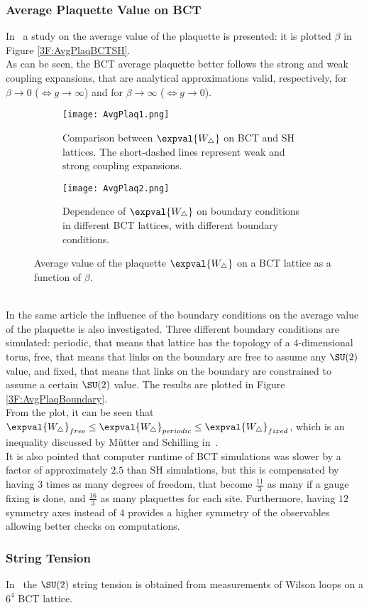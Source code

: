 \subsubsection{Average Plaquette Value on BCT}
In~\cite{Celmaster:1983vy} a study on the average value of the plaquette is presented: it is plotted \wrt $\beta$ in Figure \eqref{3F:AvgPlaqBCTSH}.\\
As can be seen, the BCT average plaquette better follows the strong and weak coupling expansions, that are analytical approximations valid, respectively, for $\beta\to0$ ($\Leftrightarrow g\to\infty$) and for $\beta\to\infty$ ($\Leftrightarrow g\to0$).
\begin{figure}[!htbp]
    \centering
    \begin{subfigure}[b]{0.475\textwidth}
        \texttt{[image: AvgPlaq1.png]}
        \caption{Comparison between $\expval{W_\bigtriangleup}$ on BCT and SH lattices. The short-dashed lines represent weak and strong coupling expansions.}
        \label{3F:AvgPlaqBCTSH}
    \end{subfigure}
    \hfill
    \begin{subfigure}[b]{0.475\textwidth}
        \texttt{[image: AvgPlaq2.png]}
        \caption{Dependence of $\expval{W_\bigtriangleup}$ on boundary conditions in different BCT lattices, with different boundary conditions.}
        \label{3F:AvgPlaqBoundary}
    \end{subfigure}
    \caption{Average value of the plaquette $\expval{W_\bigtriangleup}$ on a BCT lattice as a function of $\beta$.}
\end{figure}\\
In the same article the influence of the boundary conditions on the average value of the plaquette is also investigated.
Three different boundary conditions are simulated: periodic, that means that lattice has the topology of a $4$-dimensional torus, free, that means that links on the boundary are free to assume any $\SU(2)$ value, and fixed, that means that links on the boundary are constrained to assume a certain $\SU(2)$ value.
The results are plotted in Figure \eqref{3F:AvgPlaqBoundary}.\\
From the plot, it can be seen that $\expval{W_\bigtriangleup}_{free} \leq \expval{W_\bigtriangleup}_{periodic} \leq \expval{W_\bigtriangleup}_{fixed}$, which is an inequality discussed by Mütter and Schilling in~\cite{Konig:1983dg}.\\
It is also pointed that computer runtime of BCT simulations was slower by a factor of approximately $2.5$ than SH simulations, but this is compensated by having $3$ times as many degrees of freedom, that become $\frac{11}{3}$ as many if a gauge fixing is done, and $\frac{16}{3}$ as many plaquettes for each site.
Furthermore, having $12$ symmetry axes instead of $4$ provides a higher symmetry of the observables allowing better checks on computations.

\subsubsection{String Tension}
In~\cite{Celmaster:1983hs} the $\SU(2)$ string tension is obtained from measurements of Wilson loops on a $6^4$ BCT lattice.
